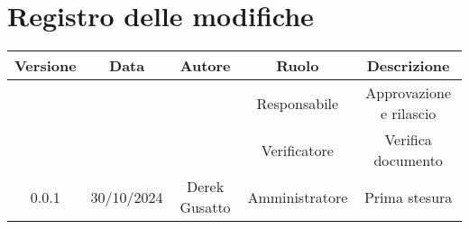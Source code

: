 
\section*{Registro delle modifiche}
\begin{table}[H]
    \begin{tabular}{|c|c|c|c|c|}
        \hline
         \textbf{Versione} &  \textbf{Data} &  \textbf{Autore} &  \textbf{Ruolo} & \textbf{Descrizione} \\
          \hline
          &  &  & Responsabile & Approvazione e rilascio\\
          \hline
          &  &  & Verificatore & Verifica documento \\
          \hline
          0.0.1& 30/10/2024 & Derek Gusatto & Amministratore & Prima stesura \\
          \hline
    \end{tabular}
\end{table}